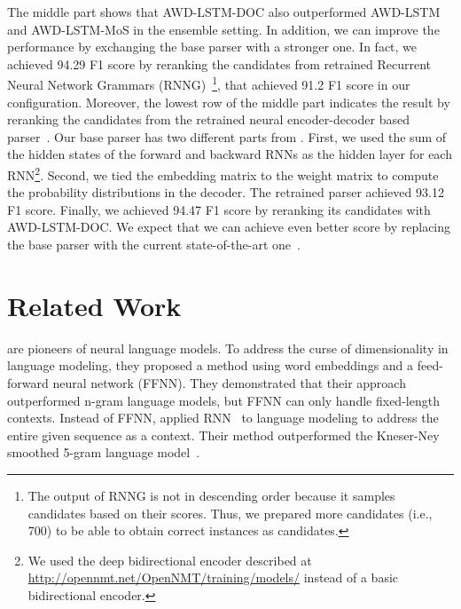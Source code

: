 \documentclass[11pt,a4paper]{article}
\begin{document}
The middle part shows that AWD-LSTM-DOC also outperformed AWD-LSTM and AWD-LSTM-MoS in the ensemble setting.
In addition, we can improve the performance by exchanging the base parser with a stronger one.
In fact, we achieved 94.29 F1 score by reranking the candidates from retrained Recurrent Neural Network Grammars (RNNG)~\cite{dyer-EtAl:2016:N16-1}\footnote{The output of RNNG is not in descending order because it samples candidates based on their scores. Thus, we prepared more candidates (i.e., 700) to be able to obtain correct instances as candidates.}, that achieved 91.2 F1 score in our configuration.
Moreover, the lowest row of the middle part indicates the result by reranking the candidates from the retrained neural encoder-decoder based parser~\cite{P18-2097}.
Our base parser has two different parts from .
First, we used the sum of the hidden states of the forward and backward RNNs as the hidden layer for each RNN\footnote{We used the deep bidirectional encoder described at \href{http://opennmt.net/OpenNMT/training/models/}{http://opennmt.net/OpenNMT/training/models/} instead of a basic bidirectional encoder.}.
Second, we tied the embedding matrix to the weight matrix to compute the probability distributions in the decoder.
The retrained parser achieved 93.12 F1 score.
Finally, we achieved 94.47 F1 score by reranking its candidates with AWD-LSTM-DOC.
We expect that we can achieve even better score by replacing the base parser with the current state-of-the-art one~\cite{P18-1249}.


\section{Related Work}
 are pioneers of neural language models.
To address the curse of dimensionality in language modeling, they proposed a method using word embeddings and a feed-forward neural network (FFNN).
They demonstrated that their approach outperformed n-gram language models, but FFNN can only handle fixed-length contexts.
Instead of FFNN,  applied RNN~\cite{elman1990finding} to language modeling to address the entire given sequence as a context.
Their method outperformed the Kneser-Ney smoothed 5-gram language model~\cite{Kneser1995,Chen:1996:ESS:981863.981904}.
\end{document}

